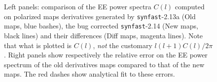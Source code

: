 \begin{figure}[hb]
\caption[Derivatives power spectra]{%
\label{fig:bug_derQU}\latexhtml{\footnotesize}{}%
Left panels: comparison of the EE power spectra $C(l)$ computed on polarized maps
derivatives generated by
{\tt synfast}-2.13a (Old maps, blue bashes), the bug corrected {\tt synfast}-2.14 (New maps, black lines)
and their differences (Diff maps, magenta lines). Note that what is plotted is
$C(l)$, {\em not} the customary $l(l+1)C(l)/2\pi$. Right panels show respectively
the relative error on the EE power spectrum of the old derivatives maps compared
to that of the new maps.
The red dashes show analytical fit to these errors.
}
\end{figure}
